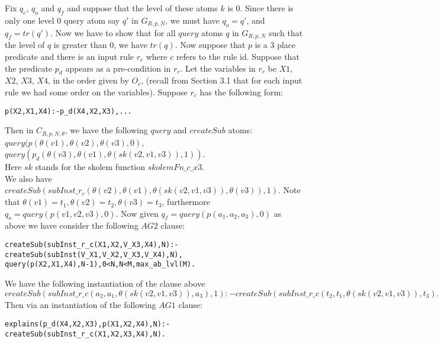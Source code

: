 \documentclass{article}
\begin{document}
\newline
Fix $q_{c}$, $q_{o}$ and $q_{f}$ and suppose that the level of these atoms $k$ is $0$. Since there is only one level $0$ query atom say $q'$ in $G_{R,p,N}$, we must have $q_{o}=q'$, and $q_{f} = tr(q')$. Now we have to show that for all $query$ atoms $q$ in $G_{R,p,N}$ such that the level of $q$ is greater than $0$, we have $tr(q)$. Now suppose that $p$ is a 3 place predicate and there is an input rule $r_{c}$ where ${c}$ refers to the rule id. Suppose that the predicate $p_{d}$ appears as a pre-condition in $r_{c}$. Let the variables in $r_{c}$ be $X1$, $X2$, $X3$, $X4$, in the order given by $O_{c}$, (recall from Section 3.1 that for each input rule we had some order on the variables). Suppose $r_{c}$ has the following form:
\begin{verbatim}
p(X2,X1,X4):-p_d(X4,X2,X3),...    
\end{verbatim}
Then in $C_{R,p,N,\theta}$, we have the following $query$ and $createSub$ atoms:\\
\newline
$query(p(\theta(v1),\theta(v2),\theta(v3),0)$, $query(p_{d}(\theta(v3),\theta(v1),\theta(sk(v2,v1,v3)),1))$. \\
\newline
Here $sk$ stands for the skolem function $skolemFn\_c\_x3$. \\
\newline
We also have $createSub(subInst\_r_{c}(\theta(v2),\theta(v1),\theta(sk(v2,v1,v3)), \theta(v3)),1)$. Note that $\theta(v1)=t_{1},\theta(v2)=t_{2},\theta(v3)=t_{3}$, furthermore $q_{o}= query(p(v1,v2,v3),0)$. Now given $q_{f} = query(p(a_{1},a_{2},a_{3}),0)$ as above we have consider the following $AG2$ clause:\newline
\begin{verbatim}
createSub(subInst_r_c(X1,X2,V_X3,X4),N):-createSub(subInst(V_X1,V_X2,V_X3,V_X4),N),
query(p(X2,X1,X4),N-1),0<N,N<M,max_ab_lvl(M).    
\end{verbatim}
We have the following instantiation of the clause above\\
\newline
$createSub(subInst\_r\_c(a_{2},a_{1},\theta(sk(v2,v1,v3)),a_{3}),1):-createSub(subInst\_r\_c(t_{2},t_{1},\theta(sk(v2,v1,v3)),t_{3}),1),q_{f}.$\\
Then via an instantiation of the following $AG1$ clause:
\begin{verbatim}
explains(p_d(X4,X2,X3),p(X1,X2,X4),N):-createSub(subInst_r_c(X1,X2,X3,X4),N).    
\end{verbatim}
\end{document}
